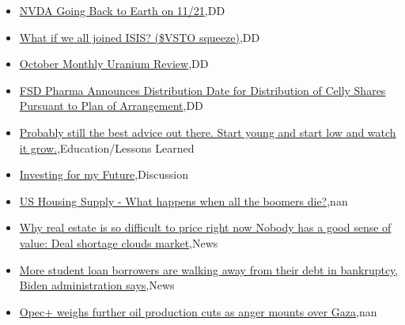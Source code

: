 \documentclass{article}%
\begin{document}
%
\begin{itemize}%
\item%
\href{https://reddit.com/r/wallstreetbets/comments/17y4j5s/nvda\_going\_back\_to\_earth\_on\_1121/}{NVDA Going Back to Earth on 11/21},DD%
\item%
\href{https://reddit.com/r/wallstreetbets/comments/17y2jkb/what\_if\_we\_all\_joined\_isis\_vsto\_squeeze/}{What if we all joined ISIS? (\$VSTO squeeze)},DD%
\item%
\href{https://reddit.com/r/Baystreetbets/comments/17xluv4/october\_monthly\_uranium\_review/}{October Monthly Uranium Review},DD%
\item%
\href{https://reddit.com/r/Baystreetbets/comments/17xgoh0/fsd\_pharma\_announces\_distribution\_date\_for/}{FSD Pharma Announces Distribution Date for Distribution of Celly Shares Pursuant to Plan of Arrangement},DD%
\item%
\href{https://reddit.com/r/StockMarket/comments/17xeal5/probably\_still\_the\_best\_advice\_out\_there\_start/}{Probably still the best advice out there. Start young and start low and watch it grow.},Education/Lessons Learned%
\item%
\href{https://reddit.com/r/StockMarket/comments/17xa4qq/investing\_for\_my\_future/}{Investing for my Future},Discussion%
\item%
\href{https://reddit.com/r/Economics/comments/17xykk1/us\_housing\_supply\_what\_happens\_when\_all\_the/}{US Housing Supply - What happens when all the boomers die?},nan%
\item%
\href{https://reddit.com/r/Economics/comments/17xs8ht/why\_real\_estate\_is\_so\_difficult\_to\_price\_right/}{Why real estate is so difficult to price right now  Nobody has a good sense of value: Deal shortage clouds market},News%
\item%
\href{https://reddit.com/r/Economics/comments/17xnbl6/more\_student\_loan\_borrowers\_are\_walking\_away\_from/}{More student loan borrowers are walking away from their debt in bankruptcy, Biden administration says},News%
\item%
\href{https://reddit.com/r/Economics/comments/17xmx0i/opec\_weighs\_further\_oil\_production\_cuts\_as\_anger/}{Opec+ weighs further oil production cuts as anger mounts over Gaza},nan%
\end{itemize}%
\end{document}
